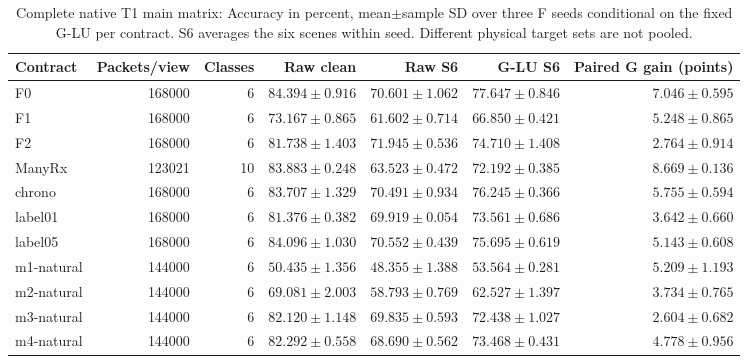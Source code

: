 \begin{table}[t]\centering\footnotesize\setlength{\tabcolsep}{4pt}

\caption{Complete native T1 main matrix: Accuracy in percent, mean$\pm$sample SD over three F seeds conditional on the fixed G-LU per contract. S6 averages the six scenes within seed. Different physical target sets are not pooled.}\label{tab:main153}

\begin{tabular}{lrrrrrr}\toprule Contract & Packets/view & Classes & Raw clean & Raw S6 & G-LU S6 & Paired G gain (points)\\\midrule

F0 & 168000 & 6 & $84.394\pm0.916$ & $70.601\pm1.062$ & $77.647\pm0.846$ & $7.046\pm0.595$\\

F1 & 168000 & 6 & $73.167\pm0.865$ & $61.602\pm0.714$ & $66.850\pm0.421$ & $5.248\pm0.865$\\

F2 & 168000 & 6 & $81.738\pm1.403$ & $71.945\pm0.536$ & $74.710\pm1.408$ & $2.764\pm0.914$\\

ManyRx & 123021 & 10 & $83.883\pm0.248$ & $63.523\pm0.472$ & $72.192\pm0.385$ & $8.669\pm0.136$\\

chrono & 168000 & 6 & $83.707\pm1.329$ & $70.491\pm0.934$ & $76.245\pm0.366$ & $5.755\pm0.594$\\

label01 & 168000 & 6 & $81.376\pm0.382$ & $69.919\pm0.054$ & $73.561\pm0.686$ & $3.642\pm0.660$\\

label05 & 168000 & 6 & $84.096\pm1.030$ & $70.552\pm0.439$ & $75.695\pm0.619$ & $5.143\pm0.608$\\

m1-natural & 144000 & 6 & $50.435\pm1.356$ & $48.355\pm1.388$ & $53.564\pm0.281$ & $5.209\pm1.193$\\

m2-natural & 144000 & 6 & $69.081\pm2.003$ & $58.793\pm0.769$ & $62.527\pm1.397$ & $3.734\pm0.765$\\

m3-natural & 144000 & 6 & $82.120\pm1.148$ & $69.835\pm0.593$ & $72.438\pm1.027$ & $2.604\pm0.682$\\

m4-natural & 144000 & 6 & $82.292\pm0.558$ & $68.690\pm0.562$ & $73.468\pm0.431$ & $4.778\pm0.956$\\


\end{tabular}
\end{table}
